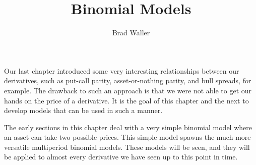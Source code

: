 \documentclass{ximera}
\title{Binomial Models}
\author{Brad Waller}
\begin{document}
\begin{abstract}
\end{abstract}
\maketitle

Our last chapter introduced some very interesting relationships between our derivatives, such as put-call parity, asset-or-nothing parity, and bull spreads, for example. The drawback to such an approach is that we were not able to get our hands on the price of a derivative. It is the goal of this chapter and the next to develop models that can be used in such a manner. 

The early sections in this chapter deal with a very simple binomial model where an asset can take two possible prices. This simple model spawns the much more versatile multiperiod binomial models. These models will be seen, and they will be applied to almost every derivative we have seen up to this point in time.
\end{document}
